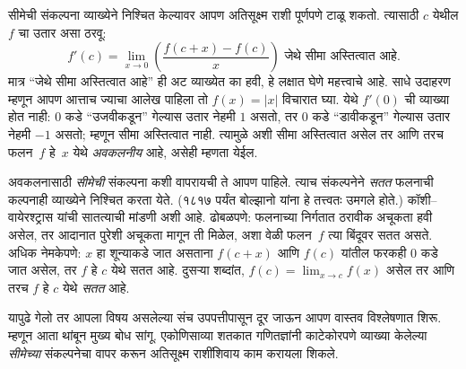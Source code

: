 \documentclass[../../../include/open-logic-section]{subfiles}
\begin{document}
सीमेची संकल्पना व्याख्येने निश्चित केल्यावर आपण अतिसूक्ष्म राशी पूर्णपणे टाळू शकतो. त्यासाठी $c$ येथील $f$ चा उतार असा ठरवू:
\[
	{f}'(c) = \lim_{x \rightarrow 0}\left(\frac{f(c +x) - f(c)}{x}\right) \text{ जेथे सीमा अस्तित्वात आहे}.
\]
मात्र “जेथे सीमा अस्तित्वात आहे” ही अट व्याख्येत का हवी, हे लक्षात घेणे महत्त्वाचे आहे. साधे उदाहरण म्हणून आपण आत्ताच ज्याचा आलेख पाहिला तो $f(x) = |x|$ विचारात घ्या. येथे $f'(0)$ ची व्याख्या होत नाही: $0$ कडे “उजवीकडून” गेल्यास उतार नेहमी $1$ असतो, तर $0$ कडे “डावीकडून” गेल्यास उतार नेहमी $-1$ असतो; म्हणून सीमा अस्तित्वात नाही. त्यामुळे अशी सीमा अस्तित्वात असेल तर आणि तरच फलन~$f$ हे~$x$ येथे \emph{अवकलनीय} आहे, असेही म्हणता येईल.

अवकलनासाठी \emph{सीमेची} संकल्पना कशी वापरायची ते आपण पाहिले. त्याच संकल्पनेने \emph{सतत} फलनाची कल्पनाही व्याख्येने निश्चित करता येते. (१८१७ पर्यंत बोल्झानो यांना हे तत्त्वतः उमगले होते.) कॉशी–वायेरश्ट्रास यांची सातत्याची मांडणी अशी आहे. ढोबळपणे: फलनाच्या निर्गतात ठरावीक अचूकता हवी असेल, तर आदानात पुरेशी अचूकता मागून ती मिळेल, अशा वेळी फलन~$f$ त्या बिंदूवर सतत असते. अधिक नेमकेपणे: $x$ हा शून्याकडे जात असताना $f(c + x)$ आणि $f(c)$ यांतील फरकही $0$ कडे जात असेल, तर $f$ हे $c$ येथे सतत आहे. दुसऱ्या शब्दांत, $f(c) = \lim_{x \rightarrow c} f(x)$ असेल तर आणि तरच $f$ हे $c$ येथे \emph{सतत} आहे.

यापुढे गेलो तर आपला विषय असलेल्या संच उपपत्तीपासून दूर जाऊन आपण वास्तव विश्लेषणात शिरू. म्हणून आता थांबून मुख्य बोध सांगू. एकोणिसाव्या शतकात गणितज्ञांनी काटेकोरपणे व्याख्या केलेल्या \emph{सीमेच्या} संकल्पनेचा वापर करून अतिसूक्ष्म राशींशिवाय काम करायला शिकले.
\end{document}
